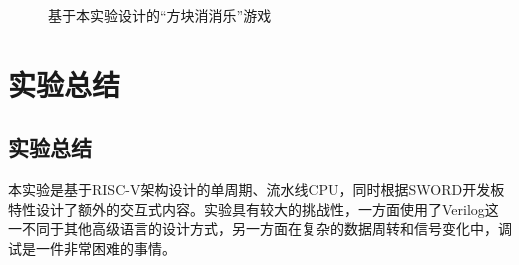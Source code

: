 \documentclass[UTF8,a4paper,autofakebold,15pt]{ctexart}
\begin{document}
\begin{figure}
	\centering
	\hspace{5pt}
	\vspace{1pt}
	\hspace{5pt}
	\caption{基于本实验设计的“方块消消乐”游戏}
\end{figure}

\section{实验总结}
\subsection{实验总结}
	本实验是基于RISC-V架构设计的单周期、流水线CPU，同时根据SWORD开发板特性设计了额外的交互式内容。实验具有较大的挑战性，一方面使用了Verilog这一不同于其他高级语言的设计方式，另一方面在复杂的数据周转和信号变化中，调试是一件非常困难的事情。
	
\end{document}
